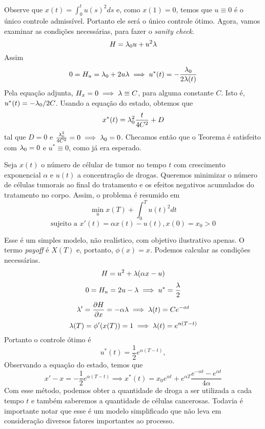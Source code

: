 Observe que $x(t) = \int_0^t u(s)^2 ds$ e, como $x(1) = 0$, temos que $u
\equiv 0$ é o único controle admissível. Portanto ele será o único controle
ótimo. Agora, vamos examinar as condições necessárias, para fazer o
\textit{sanity check}. 
$$
H = \lambda_0 u + u^2 \lambda 
$$
Assim 
$$
0 = H_u = \lambda_0 + 2u \lambda \implies u^*(t) = -\frac{\lambda_0}{2\lambda(t)}
$$
Pela equação adjunta, $H_x = 0 \implies \lambda \equiv C$, para alguma constante
$C$. Isto é, $u^*(t) = -\lambda_0/2C$. Usando a equação do estado, obtemos que 
$$
x^*(t) = \lambda_0^2 \frac{t}{4C^2} + D
$$
tal que $D = 0$ e $\frac{\lambda_0^2}{4C^2} = 0 \implies \lambda_0 = 0$. Checamos
então que o Teorema é satisfeito com $\lambda_0 = 0$ e $u^* \equiv 0$, como já era
esperado. 

\begin{example}
    Seja $x(t)$ o número de célular de tumor no tempo $t$ com crescimento
    exponencial $\alpha$ e $u(t)$ a concentração de drogas. Queremos minimizar
    o número de células tumorais ao final do tratamento e os efeitos negativos
    acumulados do tratamento no corpo. Assim, o problema é resumido em 
    $$
    \min_u x(T) + \int_0^T u(t)^2 dt
    $$
    $$
    \text{sujeito a  }x'(t) = \alpha x(t) - u(t), x(0) = x_0 > 0
    $$
\end{example}

Esse é um simples modelo, não realístico, com objetivo ilustrativo apenas. O
termo \textit{payoff} é $X(T)$ e, portanto, $\phi(x) = x$. Podemos calcular as
condições necessárias. 
$$
H = u^2 + \lambda(\alpha x - u)
$$
$$
0 = H_u = 2u - \lambda \implies u^* = \frac{\lambda}{2}
$$
$$
\lambda ' = \dfrac{\partial H}{\partial x} = - \alpha \lambda \implies \lambda(t) = Ce^{-\alpha t}
$$
$$
\lambda(T) = \phi '(x(T)) = 1 \implies \lambda(t) = e^{\alpha(T - t)}
$$
Portanto o controle ótimo é $$u^{*}(t) = \frac{1}{2}e^{\alpha(T - t)},$$
Observando a equação do estado, temos que 
$$
x' - x = - \frac{1}{2}e^{\alpha(T - t)} \implies x^*(t) = x_0 e^{\alpha t} + e^{\alpha T}\frac{e^{-\alpha t} - e^{\alpha t}}{4\alpha}
$$
Com esse método, podemos obter a quantidade de droga a ser utilizada a cada
tempo $t$ e também saberemos a quantidade de células cancerosas. Todavia é
importante notar que esse é um modelo simplificado que não leva em
consideração diversos fatores importantes ao processo. 